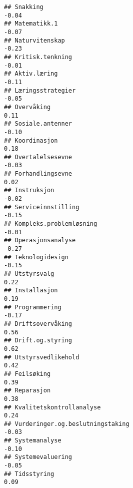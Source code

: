 \documentclass[
]{article}
\begin{document}
\begin{verbatim}
## Snakking                                                                         -0.04
## Matematikk.1                                                                     -0.07
## Naturvitenskap                                                                   -0.23
## Kritisk.tenkning                                                                 -0.01
## Aktiv.læring                                                                     -0.11
## Læringsstrategier                                                                -0.05
## Overvåking                                                                        0.11
## Sosiale.antenner                                                                 -0.10
## Koordinasjon                                                                      0.18
## Overtalelsesevne                                                                 -0.03
## Forhandlingsevne                                                                  0.02
## Instruksjon                                                                      -0.02
## Serviceinnstilling                                                               -0.15
## Kompleks.problemløsning                                                          -0.01
## Operasjonsanalyse                                                                -0.27
## Teknologidesign                                                                  -0.15
## Utstyrsvalg                                                                       0.22
## Installasjon                                                                      0.19
## Programmering                                                                    -0.17
## Driftsovervåking                                                                  0.56
## Drift.og.styring                                                                  0.62
## Utstyrsvedlikehold                                                                0.42
## Feilsøking                                                                        0.39
## Reparasjon                                                                        0.38
## Kvalitetskontrollanalyse                                                          0.24
## Vurderinger.og.beslutningstaking                                                 -0.03
## Systemanalyse                                                                    -0.10
## Systemevaluering                                                                 -0.05
## Tidsstyring                                                                       0.09

\end{verbatim}
\end{document}
